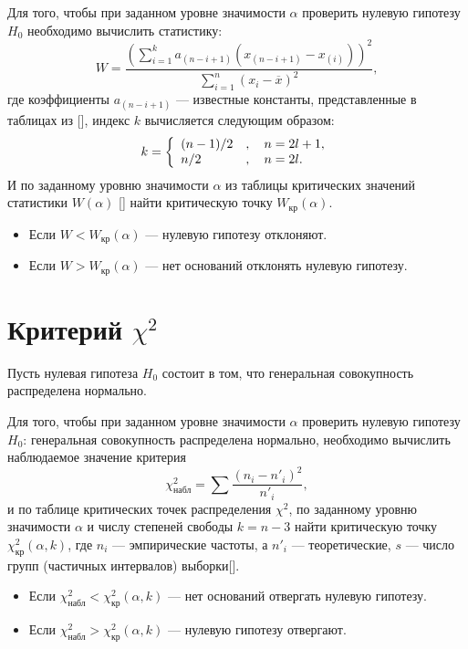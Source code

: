 Для того, чтобы при заданном уровне значимости $\alpha$ проверить нулевую гипотезу $H_0$ необходимо вычислить статистику:
\begin{equation*}
	W = \frac{(\sum_{i=1}^{k}{a_{(n-i+1)} (x_{(n-i+1)} - x_{(i)})})^2}{\sum_{i=1}^{n}{(x_i - \overline{x})^2}},
\end{equation*}
где коэффициенты $a_{(n-i+1)}$ --- известные константы, представленные в таблицах из [], индекс $k$ вычисляется следующим образом:
\begin{equation*}
k = \left\{
 \begin{array}{l l}
   (n-1) / 2 &, \quad n = 2l + 1, \\
   n / 2 &, \quad n = 2l.
 \end{array} \right.
\end{equation*} 
И по заданному уровню значимости $\alpha$ из таблицы критических значений статистики $W(\alpha)$ [] найти критическую точку $W_{\textrm{кр}}(\alpha)$.
\begin{itemize}
	\item Если $W < W_{\textrm{кр}}(\alpha)$ --- нулевую гипотезу отклоняют.
	\item Если $W > W_{\textrm{кр}}(\alpha)$ --- нет оснований отклонять нулевую гипотезу.\end{itemize}

\section*{Критерий $\chi^2$} %
\label{sec:chisq}
Пусть нулевая гипотеза $H_0$ состоит в том, что генеральная совокупность распределена нормально.

Для того, чтобы при заданном уровне значимости $\alpha$ проверить нулевую гипотезу $H_0$: генеральная совокупность распределена нормально, необходимо вычислить наблюдаемое значение критерия
\begin{equation*}
	\chi_{\textrm{набл}}^2 = \sum{\frac{(n_i-n'_i)^2}{n'_i}},
\end{equation*}
и по таблице критических точек распределения $\chi^2$, по заданному уровню значимости $\alpha$ и числу степеней свободы $k = n - 3$ найти критическую точку $\chi_{\textrm{кр}}^2(\alpha, k)$, где $n_i$ --- эмпирические частоты, а $n'_i$ --- теоретические, $s$ --- число групп (частичных интервалов) выборки[].
\begin{itemize}
	\item Если $\chi_{\textrm{набл}}^2 < \chi_{\textrm{кр}}^2(\alpha, k)$ --- нет оснований отвергать нулевую гипотезу.
	\item Если $\chi_{\textrm{набл}}^2 > \chi_{\textrm{кр}}^2(\alpha, k)$ --- нулевую гипотезу отвергают.
\end{itemize}

